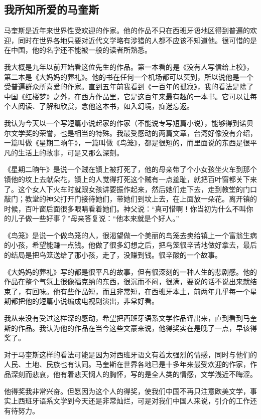 \subsection{我所知所爱的马奎斯}


\par 马奎斯是近年来世界性受欢迎的作家。他的作品不只在西班牙语地区得到普遍的欢迎，同时在世界各地只要对近代文学略有涉猎的人都不应该不知道他。很可惜的是在中国，他的名字还不能被一般的读者所熟悉。
\par 我大概是九年以前开始看这位先生的作品。第一本看的是《没有人写信给上校》，第二本是《大妈妈的葬礼》。他的书在任何一个机场都可以买到，所以说他是一个受普遍群众所喜爱的作家。直到五年前我看到《一百年的孤寂》，我的看法是除了中国《红楼梦》之外，在西方作品里，它是这百年来最有趣的一本书。它可以让每个人阅读、了解和欣赏，念他这本书，如入幻境，痴迷忘返。
\par 我认为今天以一个写短篇小说起家的作家（不能说专写短篇小说），能够得到诺贝尔文学奖的荣誉，也是相当的特殊。我最受感动的两篇文章，台湾好像没有介绍，一篇叫做《星期二晌午》，一篇叫做《鸟笼》，都是很短的，而里面说的东西是很平凡的生活上的故事，可是又那么深刻。
\par 《星期二晌午》是说一个贼在镇上被打死了，他的母亲带了个小女孩坐火车到那个镇他的坟上去献朵花，镇上的人觉得打死这个贼有一点羞耻，就把百叶窗都关下来了。这个女人下火车时就跟女孩讲要振作起来，然后她们走下去，走到教堂的门口敲门；教堂的神父打开门接待她们，带她们到坟上去，在上面放一朵花。离开镇的时候，百叶窗后面很多眼睛看着她们。神父说：“真可惜啊！你当初为什么不叫你的儿子做一些好事？”母亲答复说：“他本来就是个好人。”
\par 《鸟笼》是说一个做鸟笼的人，很渴望做一个美丽的鸟笼去卖给镇上一个富翁生病的小孩，希望能赚一点钱。他做了很多幻想之后，把鸟笼很辛苦地做好拿去，最后的结局是把鸟笼送给了那小孩，走了，没赚到钱。很辛酸的一个故事。
\par 《大妈妈的葬礼》写的都是很平凡的故事，但有很深刻的一种人生的悲剧感。他的作品在整个气氛上很像福克纳的东西，很沉而不闷，很满，要说的话不说出来就结束了，有回味。他有些作品短，而且非常短，在西班牙本土，前两年几乎每一个星期都把他的短篇小说编成电视剧演出，非常好看。
\par 我从来没有受过这样深的感动，希望把西班牙语系文学作品译出来，直到看到马奎斯的作品。我认为他的作品在当今这些文豪来说，他得奖实在是晚了一点，早该得奖了。
\par 对于马奎斯这样的看法可能是因为对西班牙语文有着太强烈的情感，同时与他们的人民、土地、民族也有认同。马奎斯在世界各地已是十多年来最受欢迎的作家，作品深刻而悲哀，他有着悲天悯人的胸怀，写的是全人类的情感，文学浅近不晦涩。
\par 他得奖我非常兴奋。但愿因为这个人的得奖，使我们中国不再只注意欧美文学，事实上西班牙语系文学到今天还是非常灿烂，可是对我们中国人来说，引介的工作还有待努力。


